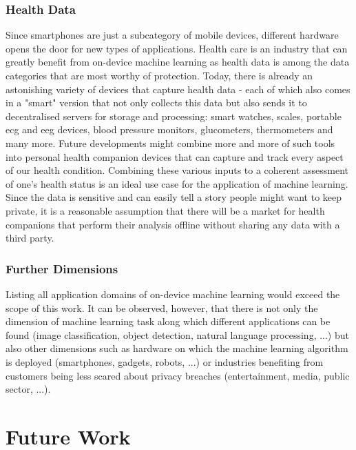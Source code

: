 \documentclass[
			   fontsize=11pt,
               paper=a4,
               bibliography=totoc,
               idxtotoc,
               headsepline,
               footsepline,
               footinclude=false,
               BCOR=12mm,
               DIV=13,
               openany,   %
               ]
               {scrbook}
\begin{document}
\subsubsection{Health Data}
Since smartphones are just a subcategory of mobile devices, different hardware opens the door for new types of applications. Health care is an industry that can greatly benefit from on-device machine learning as health data is among the data categories that are most worthy of protection. Today, there is already an astonishing variety of devices that capture health data - each of which also comes in a "smart" version that not only collects this data but also sends it to decentralised servers for storage and processing: smart watches, scales, portable \gls{ecg} and \gls{eeg} devices, blood pressure monitors, glucometers, thermometers and many more. Future developments might combine more and more of such tools into personal health companion devices that can capture and track every aspect of our health condition. Combining these various inputs to a coherent assessment of one's health status is an ideal use case for the application of machine learning. Since the data is sensitive and can easily tell a story people might want to keep private, it is a reasonable assumption that there will be a market for health companions that perform their analysis offline without sharing any data with a third party.

\subsubsection{Further Dimensions}
Listing all application domains of on-device machine learning would exceed the scope of this work. It can be observed, however, that there is not only the dimension of machine learning task along which different applications can be found (image classification, object detection, natural language processing, ...) but also other dimensions such as hardware on which the machine learning algorithm is deployed (smartphones, gadgets, robots, ...) or industries benefiting from customers being less scared about privacy breaches (entertainment, media, public sector, ...).


\section{Future Work}
\end{document}
